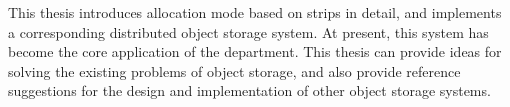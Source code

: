 \begin{abstract*}
This thesis introduces allocation mode based on strips in detail, and implements a corresponding distributed object storage system. At present, this system has become the core application of the department. This thesis can provide ideas for solving the existing problems of object storage, and also provide reference suggestions for the design and implementation of other object storage systems.


\end{abstract*}
